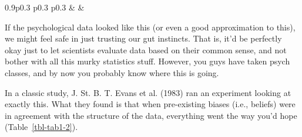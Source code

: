 \documentclass[
  a4paper,
]{book}
\begin{document}
\begin{table}[ht]
\begin{centerbox}
\begin{threeparttable}
\begin{tabularx}{0.9\textwidth}{p{} p{} p{}}
 &
 &
 \tabularnewline[-0.5pt]


\end{tabularx} 

\end{threeparttable}\par\end{centerbox}

\end{table}
 

If the psychological data looked like this (or even a good approximation
to this), we might feel safe in just trusting our gut instincts. That
is, it'd be perfectly okay just to let scientists evaluate data based on
their common sense, and not bother with all this murky statistics stuff.
However, you guys have taken psych classes, and by now you probably know
where this is going.

In a classic study, J. St. B. T. Evans et al. (1983) ran an experiment
looking at exactly this. What they found is that when pre-existing
biases (i.e., beliefs) were in agreement with the structure of the data,
everything went the way you'd hope (Table~\ref{tbl-tab1-2}).

\hypertarget{tbl-tab1-2}{}
 
  \providecommand{\huxb}[2]{\arrayrulecolor[RGB]{#1}\global\arrayrulewidth=#2pt}
  \providecommand{\huxvb}[2]{\color[RGB]{#1}\vrule width #2pt}
  \providecommand{\huxtpad}[1]{\rule{0pt}{#1}}
  \providecommand{\huxbpad}[1]{\rule[-#1]{0pt}{#1}}
\end{document}
